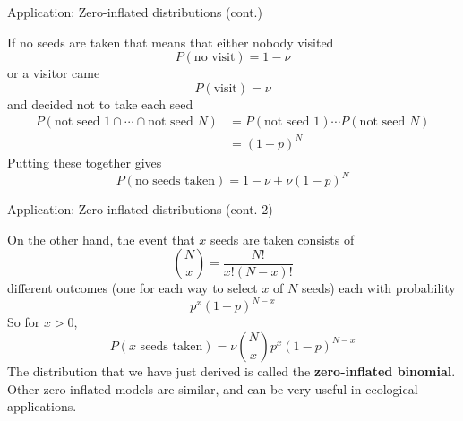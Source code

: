 \documentclass[
  ignorenonframetext,
]{beamer}
\begin{document}
\begin{frame}{Application: Zero-inflated distributions (cont.)}
\protect\hypertarget{application-zero-inflated-distributions-cont.}{}

If no seeds are taken that means that either nobody visited \[
P(\text{no visit})=1-\nu
\] or a visitor came \[
P(\text{visit})=\nu
\] and decided not to take each seed \begin{align*}
P(\text{not seed 1}\cap\cdots\cap\text{not seed }N) &= P(\text{not seed 1})\cdots P(\text{not seed }N)\\
&= (1-p)^N
\end{align*} Putting these together gives \[
P(\text{no seeds taken})=1-\nu+\nu(1-p)^N
\]

\end{frame}

\begin{frame}{Application: Zero-inflated distributions (cont. 2)}
\protect\hypertarget{application-zero-inflated-distributions-cont.-2}{}

On the other hand, the event that \(x\) seeds are taken consists of \[
{N\choose x}=\frac{N!}{x!(N-x)!}
\] different outcomes (one for each way to select \(x\) of \(N\) seeds)
each with probability \[
p^x(1-p)^{N-x}
\] So for \(x>0\), \[
P(x\text{ seeds taken})=\nu{N\choose x}p^x(1-p)^{N-x}
\] The distribution that we have just derived is called the
\textbf{zero-inflated binomial}. Other zero-inflated models are similar,
and can be very useful in ecological applications.

\end{frame}
\end{document}
